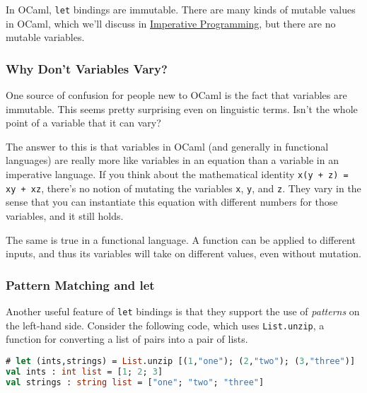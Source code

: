 In OCaml, \passthrough{\lstinline!let!} bindings are immutable. There
are many kinds of mutable values in OCaml, which we'll discuss in
\href{imperative-programming.html\#imperative-programming-1}{Imperative
Programming}, but there are no mutable variables.

\hypertarget{why-dont-variables-vary}{%
\subsubsection{Why Don't Variables
Vary?}\label{why-dont-variables-vary}}

One source of confusion for people new to OCaml is the fact that
variables are immutable. This seems pretty surprising even on linguistic
terms. Isn't the whole point of a variable that it can
vary?

The answer to this is that variables in OCaml (and generally in
functional languages) are really more like variables in an equation than
a variable in an imperative language. If you think about the
mathematical identity \passthrough{\lstinline!x(y + z) = xy + xz!},
there's no notion of mutating the variables \passthrough{\lstinline!x!},
\passthrough{\lstinline!y!}, and \passthrough{\lstinline!z!}. They vary
in the sense that you can instantiate this equation with different
numbers for those variables, and it still holds.

The same is true in a functional language. A function can be applied to
different inputs, and thus its variables will take on different values,
even without mutation.

\hypertarget{pattern-matching-and-let}{%
\subsubsection{Pattern Matching and
let}\label{pattern-matching-and-let}}

Another useful feature of \passthrough{\lstinline!let!} bindings is that
they support the use of \emph{patterns} on the left-hand side. Consider
the following code, which uses \passthrough{\lstinline!List.unzip!}, a
function for converting a list of pairs into a pair of
lists.

\begin{lstlisting}[language=Caml]
# let (ints,strings) = List.unzip [(1,"one"); (2,"two"); (3,"three")]
val ints : int list = [1; 2; 3]
val strings : string list = ["one"; "two"; "three"]
\end{lstlisting}

